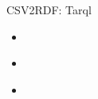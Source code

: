 \documentclass[aspectratio=1610]{beamer}
\begin{document}
\begin{frame}{CSV2RDF: Tarql}
\centering
\begin{itemize}
\item 
\end{itemize}
\end{frame}

\begin{frame}{}
\centering
\begin{itemize}
\item 
\end{itemize}
\end{frame}

\begin{frame}{}
\centering
\begin{itemize}
\item 
\end{itemize}
\end{frame}
\end{document}
